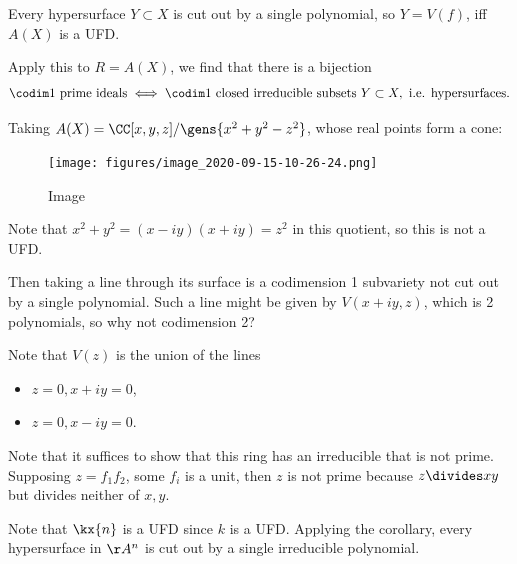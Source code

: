 \begin{corollary}[?]

Every hypersurface \(Y\subset X\) is cut out by a single polynomial, so
\(Y=V(f)\), iff \(A(X)\) is a UFD.

\end{corollary}

\begin{example}

Apply this to \(R=A(X)\), we find that there is a bijection
\begin{align*}  
\codim 1 \text{ prime ideals}
\iff 
\codim 1 \text{ closed irreducible subsets }Y\subset X,\text{ i.e. hypersurfaces}
.\end{align*}

Taking \(A(X) = \CC[x,y,z]/\gens{x^2+y^2-z^2}\), whose real points form
a cone:

\begin{figure}
\centering
\texttt{[image: figures/image\_2020-09-15-10-26-24.png]}
\caption{Image}
\end{figure}

Note that \(x^2 + y^2 = (x-iy)(x+iy) = z^2\) in this quotient, so this
is not a UFD.

Then taking a line through its surface is a codimension 1 subvariety not
cut out by a single polynomial. Such a line might be given by
\(V(x + iy, z)\), which is 2 polynomials, so why not codimension 2?

Note that \(V(z)\) is the union of the lines

\begin{itemize}
\tightlist
\item
  \(z = 0, x + iy= 0\),
\item
  \(z=0, x - iy = 0\).
\end{itemize}

Note that it suffices to show that this ring has an irreducible that is
not prime. Supposing \(z = f_1 f_2\), some \(f_i\) is a unit, then \(z\)
is not prime because \(z\divides xy\) but divides neither of \(x,y\).

\end{example}

\begin{example}

Note that \(\kx{n}\) is a UFD since \(k\) is a UFD. Applying the
corollary, every hypersurface in \(\AA^n\) is cut out by a single
irreducible polynomial.

\end{example}

